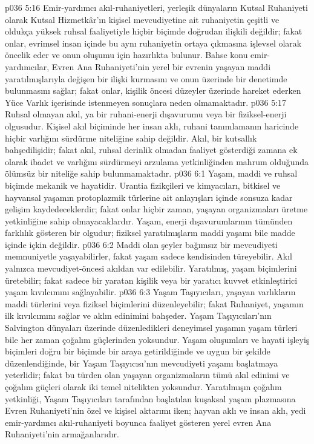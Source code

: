 \vs p036 5:16 Emir\hyp{}yardımcı akıl\hyp{}ruhaniyetleri, yerleşik dünyaların Kutsal Ruhaniyeti olarak Kutsal Hizmetkâr’ın kişisel mevcudiyetine ait ruhaniyetin çeşitli ve oldukça yüksek ruhsal faaliyetiyle hiçbir biçimde doğrudan ilişkili değildir; fakat onlar, evrimsel insan içinde bu aynı ruhaniyetin ortaya çıkmasına işlevsel olarak öncelik eder ve onun oluşumu için hazırlıkta bulunur. Bahse konu emir\hyp{}yardımcılar, Evren Ana Ruhaniyeti’nin yerel bir evrenin yaşayan maddi yaratılmışlarıyla değişen bir ilişki kurmasını ve onun üzerinde bir denetimde bulunmasını sağlar; fakat onlar, kişilik öncesi düzeyler üzerinde hareket ederken Yüce Varlık içerisinde istenmeyen sonuçlara neden olmamaktadır.
\vs p036 5:17 Ruhsal olmayan akıl, ya bir ruhani\hyp{}enerji dışavurumu veya bir fiziksel\hyp{}enerji olgusudur. Kişisel akıl biçiminde her insan aklı, ruhani tanımlamanın haricinde hiçbir varlığını sürdürme niteliğine sahip değildir. Akıl, bir kutsallık bahşedilişidir; fakat akıl, ruhsal derinlik olmadan faaliyet gösterdiği zamana ek olarak ibadet ve varlığını sürdürmeyi arzulama yetkinliğinden mahrum olduğunda ölümsüz bir niteliğe sahip bulunmamaktadır.
\vs p036 6:1 Yaşam, maddi ve ruhsal biçimde mekanik ve hayatidir. Urantia fizikçileri ve kimyacıları, bitkisel ve hayvansal yaşamın protoplazmik türlerine ait anlayışları içinde sonsuza kadar gelişim kaydedeceklerdir; fakat onlar hiçbir zaman, yaşayan organizmaları üretme yetkinliğine sahip olmayacaklardır. Yaşam, enerji dışavurumlarının tümünden farklılık gösteren bir olgudur; fiziksel yaratılmışların maddi yaşamı bile madde içinde içkin değildir.
\vs p036 6:2 Maddi olan şeyler bağımsız bir mevcudiyeti memnuniyetle yaşayabilirler, fakat yaşam sadece kendisinden türeyebilir. Akıl yalnızca mevcudiyet\hyp{}öncesi akıldan var edilebilir. Yaratılmış, yaşam biçimlerini üretebilir; fakat sadece bir yaratan kişilik veya bir yaratıcı kuvvet etkinleştirici yaşam kıvılcımını sağlayabilir.
\vs p036 6:3 Yaşam Taşıyıcıları, yaşayan varlıkların maddi türlerini veya fiziksel biçimlerini düzenleyebilir; fakat Ruhaniyet, yaşamın ilk kıvılcımını sağlar ve aklın edinimini bahşeder. Yaşam Taşıyıcıları’nın Salvington dünyaları üzerinde düzenledikleri deneyimsel yaşamın yaşam türleri bile her zaman çoğalım güçlerinden yoksundur. Yaşam oluşumları ve hayati işleyiş biçimleri doğru bir biçimde bir araya getirildiğinde ve uygun bir şekilde düzenlendiğinde, bir Yaşam Taşıyıcısı’nın mevcudiyeti yaşamı başlatmaya yeterlidir; fakat bu türden olan yaşayan organizmaların tümü akıl edinimi ve çoğalım güçleri olarak iki temel nitelikten yoksundur. Yaratılmışın çoğalım yetkinliği, Yaşam Taşıyıcıları tarafından başlatılan kuşaksal yaşam plazmasına Evren Ruhaniyeti’nin özel ve kişisel aktarımı iken; hayvan aklı ve insan aklı, yedi emir\hyp{}yardımcı akıl\hyp{}ruhaniyeti boyunca faaliyet gösteren yerel evren Ana Ruhaniyeti’nin armağanlarıdır.
